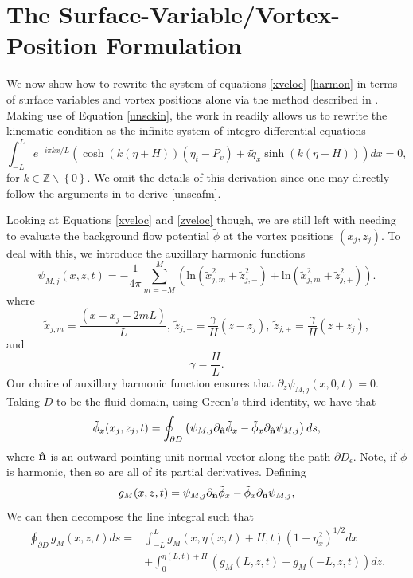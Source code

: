 \documentclass[a4paper,11pt]{article}
\newcommand{\p}{\partial}
\begin{document}
\section{The Surface-Variable/Vortex-Position Formulation}
We now show how to rewrite the system of equations \eqref{xveloc}-\eqref{harmon} in terms of surface variables and vortex positions alone via the method described in \cite{afm}.  Making use of Equation \eqref{unsckin}, the work in \cite{afm} readily allows us to rewrite the kinematic condition as the infinite system of integro-differential equations  
\begin{equation}
\int_{-L}^{L} e^{-i\pi k x/L}\left(\cosh( k(\eta+H))\left(\eta_{t} - P_{v} \right) + i\tilde{q}_{x}\sinh(k( \eta+H))\right) dx = 0, \label{unscafm}
\end{equation}
for $k \in \mathbb{Z}\backslash\left\{0\right\}$.  We omit the details of this derivation since one may directly follow the arguments in \cite{afm} to derive \eqref{unscafm}.

Looking at Equations \eqref{xveloc} and \eqref{zveloc} though, we are still left with needing to evaluate the background flow potential $\tilde{\phi}$ at the vortex positions $\left(x_{j}, z_{j}\right)$.  To deal with this, we introduce the auxillary harmonic functions 
\[
\psi_{M,j}(x,z,t) = - \frac{1}{4\pi}\sum_{m=-M}^{M} \left( \mbox{ln}\left( \tilde{x}_{j,m}^{2} + \tilde{z}_{j,-}^{2}  \right) + \mbox{ln}\left( \tilde{x}_{j,m}^{2} + \tilde{z}_{j,+}^{2} \right)\right).
\]
where
\[
\tilde{x}_{j,m} = \frac{(x-x_{j}-2mL)}{L}, ~ \tilde{z}_{j,-} = \frac{\gamma}{H}(z-z_{j}), ~ \tilde{z}_{j,+} = \frac{\gamma}{H}(z+z_{j}),
\]
and
\[
\gamma = \frac{H}{L}.
\]
Our choice of auxillary harmonic function ensures that $\p_{z}\psi_{M,j}(x,0,t)=0$.  Taking $D$ to be the fluid domain, using Green's third identity, we have that 
\[
\tilde{\phi}_{x}(x_{j},z_{j},t) =  \oint_{\p D} \left(\psi_{M,j}\p_{\hat{{\bf n}}}\tilde{\phi}_{x}-\tilde{\phi}_{x}\p_{\hat{{\bf n}}}\psi_{M,j} \right) ds,
\]
where $\hat{{\bf n}}$ is an outward pointing unit normal vector along the path $\p D_{\epsilon}$.  Note, if $\tilde{\phi}$ is harmonic, then so are all of its partial derivatives.  Defining
\[
g_{M}(x,z,t) = \psi_{M,j}\p_{\hat{{\bf n}}}\tilde{\phi}_{x}-\tilde{\phi}_{x}\p_{\hat{{\bf n}}}\psi_{M,j},
\]
We can then decompose the line integral such that 
\begin{align*}
\oint_{\p D} g_{M}(x,z,t) ds = & \int_{-L}^{L}g_{M}(x,\eta(x,t)+H,t) (1+\eta_{x}^{2})^{1/2}dx \\
& + \int_{0}^{\eta(L,t)+H} \left(g_{M}(L,z,t) + g_{M}(-L,z,t)\right) dz.  
\end{align*}
\end{document}
